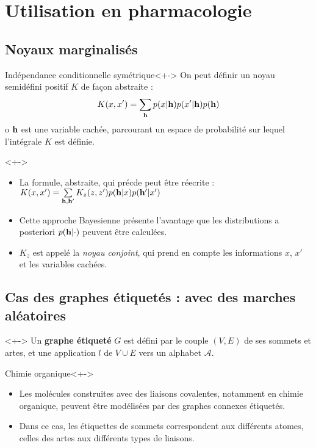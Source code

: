 \section{Utilisation en pharmacologie}

\subsection{Noyaux marginalis\'es}

\begin{frame}
\begin{block}{Ind\'ependance conditionnelle sym\'etrique}<+->
On peut d\'efinir un noyau semid\'efini positif $K$ de fa\c con abstraite :
\[K(x,x')=\sum\limits_{\mathbf{h}}p(x|\mathbf{h})p(x'|\mathbf{h})p(\mathbf{h})\]
o $\mathbf{h}$ est une variable cach\'ee, parcourant un espace de probabilit\'e sur lequel l'int\'egrale $K$ est d\'efinie.
\end{block}
\end{frame}
\begin{frame}
\begin{definition}<+->
\begin{itemize}
\item<+-> La formule, abstraite, qui pr\'ecde peut \^etre r\'eecrite : %
$K(x,x')=\sum\limits_{\mathbf{h},\mathbf{h}'}K_z(z,z')p(\mathbf{h}|x)p(\mathbf{h}'|x')$
\item<+-> Cette approche Bayesienne pr\'esente l'avantage que les distributions a posteriori $p(\mathbf{h}|\cdot)$ peuvent \^etre calcul\'ees.
\item<+-> $K_z$ est appel\'e la \emph{noyau conjoint}, qui prend en compte les informations $x$, $x'$ et les variables cach\'ees.
\end{itemize}
\end{definition}
\end{frame}

\subsection{Cas des graphes \'etiquet\'es : avec des marches al\'eatoires}

\begin{frame}
\begin{definition}<+->
Un \textbf{graphe \'etiquet\'e} $G$ est d\'efini par le couple $(V,E)$ de ses sommets et artes, et une application $l$ de $V\cup E$ vers un alphabet $\mathcal{A}$.
\end{definition}
\begin{block}{Chimie organique}<+->
\begin{itemize}
\item<+-> Les mol\'ecules construites avec des liaisons covalentes, notamment en chimie organique, peuvent \^etre mod\'elis\'ees par des graphes connexes \'etiquet\'es.
\item<+-> Dans ce cas, les \'etiquettes de sommets correspondent aux diff\'erents atomes, celles des artes aux diff\'erents types de liaisons.
\end{itemize}
\end{block}
\end{frame}

